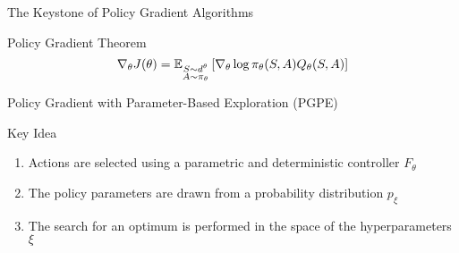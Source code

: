\begin{frame}{The Keystone of Policy Gradient Algorithms}
	
	\begin{block}{Policy Gradient Theorem}
		\begin{equation*}
			\nabla_\theta J(\theta) =
			\E[\substack{S \sim d^\theta\\A \sim \pi_\theta}]{\nabla_\theta\log
			\pi_\theta(S,A) Q_{\theta}(S, A)}
		\end{equation*}
	\end{block}
	
	
\end{frame}

\begin{frame}{Policy Gradient with Parameter-Based Exploration (PGPE)}
	\begin{block}{Key Idea}
		\begin{enumerate}
			\item<+-> Actions are selected using a parametric and deterministic controller $F_\theta$
			\item<+-> The policy parameters are drawn from a probability distribution $p_\xi$
			\item<+-> The search for an optimum is performed in the space of the hyperparameters $\xi$
		\end{enumerate}
	\end{block}
	
\end{frame}


